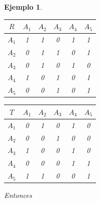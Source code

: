 \documentclass[a5paper,doc,10pt,noapacite]{apa6}
\newtheorem{ejem}{Ejemplo}
\begin{document}
{{\begin{ejem}
%
\begin{table}[H]
	\fontsize{7}{11}\selectfont
    \begin{minipage}{.5\linewidth}
      \centering
	\begin{tabular}{c|ccccc} \thickline
	\(R\) & \(A_1\) & \(A_2\) & \(A_3\) & \(A_4\) & \(A_5\)  \\	\hline
    \(A_1\) & 1 & 1 & 0 & 1 & 1  \\
    \(A_2\) & 0 & 1 & 1 & 0 & 1  \\
	\(A_3\) & 0 & 1 & 0 & 1 & 0   \\
	\(A_4\) & 1 & 0 & 1 & 0 & 1   \\
	\(A_5\) & 0 & 0 & 1 & 0 & 1   \\
\end{tabular}
\label{tab:B2} 
    \end{minipage}%
    \begin{minipage}{.5\linewidth}
      \centering
	\begin{tabular}{c|ccccc} \thickline
	\(T\) & \(A_1\) & \(A_2\) & \(A_3\) & \(A_4\) & \(A_5\)  \\	\hline
    \(A_1\) & 0 & 1 & 0 & 1 & 0  \\
    \(A_2\) & 0 & 0 & 1 & 0 & 0  \\
	\(A_3\) & 1 & 0 & 0 & 1 & 0   \\
	\(A_4\) & 0 & 0 & 0 & 1 & 1   \\
	\(A_5\) & 1 & 1 & 0 & 0 & 1   \\
\end{tabular}
\label{tab:B3}
    \end{minipage} 
\end{table}
%


Entonces


\end{ejem}}}
\end{document}
